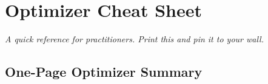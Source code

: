 \documentclass[../main.tex]{subfiles}
\begin{document}
\chapter{Optimizer Cheat Sheet}\label{app:cheatsheet}

\begin{center}
\textit{A quick reference for practitioners. Print this and pin it to your wall.}
\end{center}

\vspace{0.5cm}

\section{One-Page Optimizer Summary}\label{sec:cheat-optimizer-table}
\end{document}
